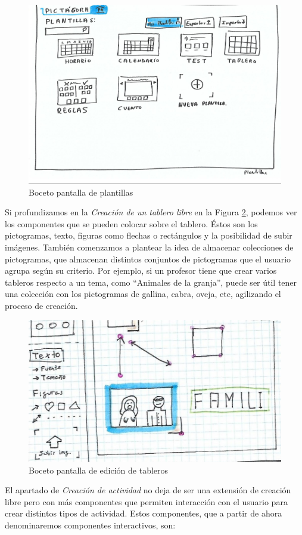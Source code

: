 \begin{figure}[h!]
	\centering
	\includegraphics[width=0.7\linewidth]{Imagenes/Bitmap/inicioAlfonso}
	\caption{Boceto pantalla de plantillas}
	\label{fig:inicioalfonso}
\end{figure}


 Si profundizamos en la \textit{Creación de un tablero libre} en la Figura \ref{fig:dibujolibrealfon}, podemos ver los componentes que se pueden colocar sobre el tablero. Éstos son los pictogramas, texto, figuras como flechas o rectángulos y la posibilidad de subir imágenes. También comenzamos a plantear la idea de almacenar colecciones de pictogramas, que almacenan distintos conjuntos de pictogramas que el usuario agrupa según su criterio. Por ejemplo, si un profesor tiene que crear varios tableros respecto a un tema, como “Animales de la granja”, puede ser útil tener una colección con los pictogramas de gallina, cabra, oveja, etc, agilizando el proceso de creación.

\begin{figure}[h!]
	\centering
	\includegraphics[width=0.7\linewidth]{Imagenes/Bitmap/DibujoLibreAlfon}
	\caption{Boceto pantalla de edición de tableros }
	\label{fig:dibujolibrealfon}
\end{figure}

El apartado de \textit{Creación de actividad} no deja de ser una extensión de creación libre pero con más  componentes que permiten interacción con el usuario para crear distintos tipos de actividad. Estos componentes, que a partir de ahora denominaremos componentes interactivos, son:

